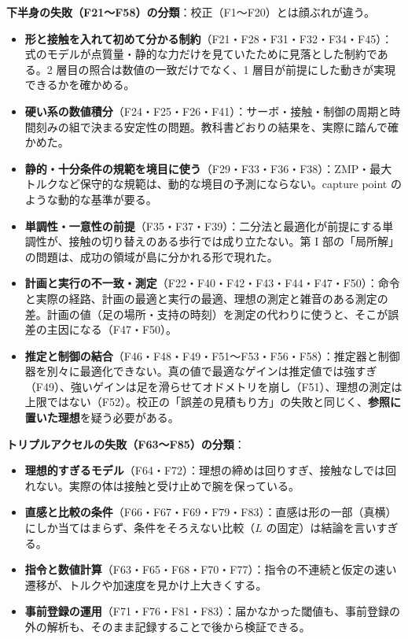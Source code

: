 \documentclass[paper=a4paper,fontsize=10pt,twocolumn,column_gap=2zw,line_length=24zw,number_of_lines=46,head_space=20mm]{jlreq}
\begin{document}
\textbf{下半身の失敗（F21〜F58）の分類}：校正（F1〜F20）とは顔ぶれが違う。
\begin{itemize}\setlength{\itemsep}{0pt}
\item \textbf{形と接触を入れて初めて分かる制約}（F21・F28・F31・F32・F34・F45）：式のモデルが点質量・静的な力だけを見ていたために見落とした制約である。2 層目の照合は数値の一致だけでなく、1 層目が前提にした動きが実現できるかを確かめる。
\item \textbf{硬い系の数値積分}（F24・F25・F26・F41）：サーボ・接触・制御の周期と時間刻みの組で決まる安定性の問題。教科書どおりの結果を、実際に踏んで確かめた。
\item \textbf{静的・十分条件の規範を境目に使う}（F29・F33・F36・F38）：ZMP・最大トルクなど保守的な規範は、動的な境目の予測にならない。capture point のような動的な基準が要る。
\item \textbf{単調性・一意性の前提}（F35・F37・F39）：二分法と最適化が前提にする単調性が、接触の切り替えのある歩行では成り立たない。第 I 部の「局所解」の問題は、成功の領域が島に分かれる形で現れた。
\item \textbf{計画と実行の不一致・測定}（F22・F40・F42・F43・F44・F47・F50）：命令と実際の経路、計画の最適と実行の最適、理想の測定と雑音のある測定の差。計画の値（足の場所・支持の時刻）を測定の代わりに使うと、そこが誤差の主因になる（F47・F50）。
\item \textbf{推定と制御の結合}（F46・F48・F49・F51〜F53・F56・F58）：推定器と制御器を別々に最適化できない。真の値で最適なゲインは推定値では強すぎ（F49）、強いゲインは足を滑らせてオドメトリを崩し（F51）、理想の測定は上限ではない（F52）。校正の「誤差の見積もり方」の失敗と同じく、\textbf{参照に置いた理想}を疑う必要がある。
\end{itemize}

\textbf{トリプルアクセルの失敗（F63〜F85）の分類}：
\begin{itemize}\setlength{\itemsep}{0pt}
\item \textbf{理想的すぎるモデル}（F64・F72）：理想の締めは回りすぎ、接触なしでは回れない。実際の体は接触と受け止めで腕を保っている。
\item \textbf{直感と比較の条件}（F66・F67・F69・F79・F83）：直感は形の一部（真横）にしか当てはまらず、条件をそろえない比較（$L$ の固定）は結論を言いすぎる。
\item \textbf{指令と数値計算}（F63・F65・F68・F70・F77）：指令の不連続と仮定の速い遷移が、トルクや加速度を見かけ上大きくする。
\item \textbf{事前登録の運用}（F71・F76・F81・F83）：届かなかった閾値も、事前登録の外の解析も、そのまま記録することで後から検証できる。
\end{itemize}
\end{document}
